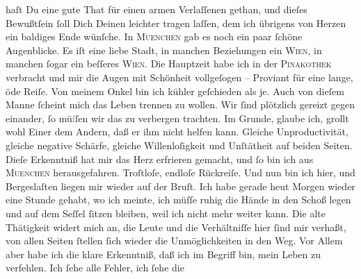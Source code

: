 \begin{ledgroupsized}[t]{13cm}
               haſt Du eine gute That für einen \strikeout{\textcolor{gray}{ar}} armen Verlaſſenen gethan, und dieſes Bewußtſein ſoll Dich Deinen \label{K_L02717-2v}\label{K_L02717-2h}
               leichter tragen laſſen, dem ich übrigens von Herzen ein baldiges Ende wünſche.\pend
           \pstart
           In \textsc{Muenchen} gab es noch ein paar ſchöne Augenblicke. Es iſt eine liebe Stadt, in {\pb}manchen Beziehungen ein \textsc{Wien}, in manchen ſogar ein beſſeres \textsc{Wien}. Die Hauptzeit habe ich in der \textsc{Pinakothek} verbracht und mir die Augen mit Schönheit vollgeſogen – Proviant für eine
               lange, öde Reiſe.  Von meinem
                  Onkel bin ich kühler
               geſchieden als je. Auch von dieſem Manne ſcheint mich das Leben trennen zu wollen. Wir ſind plötzlich gereizt
               gegen einander, ſo mü\textcolor{gray}{ſ}ſen wir das zu verbergen trachten. Im
               Grunde, glaube ich, grollt wohl Einer dem Andern, daß er ihm nicht helfen kann.
               Gleiche Unproductivität, gleiche negative Schärfe, gleiche Willenloſigkeit und
               Unſtätheit auf beiden Seiten. Dieſe Erkenntniß hat mir das Herz erfrieren gemacht,
               und ſo bin ich aus \textsc{Muenchen} herausgefahren. Troſtloſe, endloſe Rückreiſe. {\pb}Und nun bin ich hier, und Bergeslaſten liegen mir wieder auf der Bruſt. Ich habe
               gerade heut{ }Morgen wieder eine Stunde gehabt, wo ich meinte, ich müſſe ruhig die
               Hände in den Schoß legen und auf dem Seſſel ſitzen bleiben, weil ich nicht mehr
               weiter kann. Die alte Thätigkeit widert mich an, die Leute und die Verhältniſſe hier
               ſind mir verhaßt, von allen Seiten ſtellen ſich wieder die Unmöglichkeiten in den
               Weg. Vor Allem  aber habe ich  die klare Erkenntniß, daß
               ich im Begriff bin, mein Leben zu verfehlen. Ich ſehe alle Fehler, ich ſehe die

\end{ledgroupsized}
